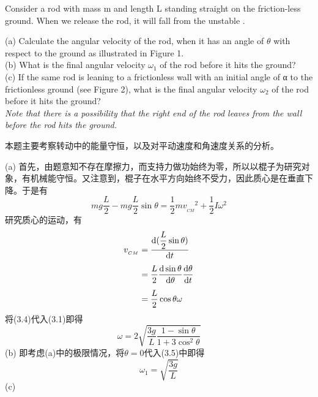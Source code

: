 \begin{solution}
    Consider a rod with mass m and length L standing straight on the friction-less ground. When we
    release the rod, it will fall from the unstable .
    \begin{center}
        \quad
    \end{center}
    (a) Calculate the angular velocity of the rod, when it has an angle of $\theta$ with respect to the ground
    as illustrated in Figure 1.\\
    (b) What is the final angular velocity $\omega_1$ of the rod before it hits the ground?\\
    (c) If the same rod is leaning to a frictionless wall with an initial angle of α to the frictionless
    ground (see Figure 2), what is the final angular velocity $\omega_2$ of the rod before it hits the ground?\\
    {\em Note that there is a possibility that the right end of the rod leaves from the wall before the rod hits the ground.}

    \tcbrule

    本题主要考察转动中的能量守恒，以及对平动速度和角速度关系的分析。

    (a) 首先，由题意知不存在摩擦力，而支持力做功始终为零，所以以棍子为研究对象，有机械能守恒。又注意到，棍子在水平方向始终不受力，因此质心是在垂直下降。于是有
    \begin{equation}
        mg\dfrac{L}{2}-mg\dfrac{L}{2}\sin\theta=\dfrac{1}{2}mv_{_{CM}}{}^2+\dfrac{1}{2}I\omega^2
    \end{equation}
    研究质心的运动，有
    \begin{align}
        v_{_{CM}} & =\dfrac{\dif (\dfrac{L}{2}\sin\theta)}{\dif t}                            \\[1ex]
                  & =\dfrac{L}{2}\dfrac{\dif\sin\theta}{\dif\theta}\dfrac{\dif\theta}{\dif t} \\[1ex]
                  & =\dfrac{L}{2}\cos\theta\omega
    \end{align}
    将(3.4)代入(3.1)即得
    \begin{equation}
        \omega=2\sqrt{\dfrac{3g}{L}\dfrac{1-\sin\theta}{1+3\cos^2\theta}}
    \end{equation}
    (b) 即考虑(a)中的极限情况，将$\theta=0$代入(3.5)中即得
    \begin{equation}
        \omega_1=\sqrt{\dfrac{3g}{L}}
    \end{equation}
    (c) \begin{center}
\end{center}
\end{solution}

